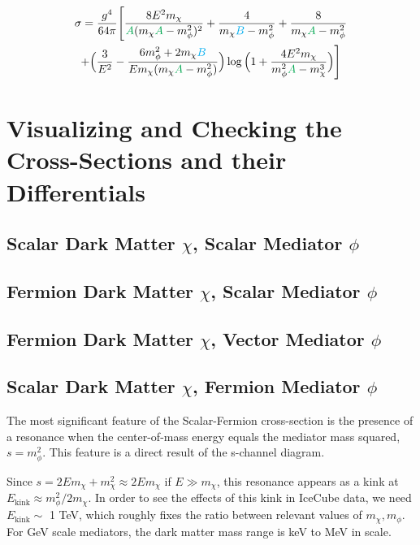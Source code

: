 \documentclass[11pt, oneside]{article}   	%
\begin{document}
\begin{multline*}
    \sigma = \frac{g^4}{64\pi} \Bigg[ \frac{8E^2 m_\chi}{\textcolor{Green}{A}(m_\chi \textcolor{Green}{A} - m_\phi^2)^2} + \frac{4}{m_\chi \textcolor{cyan}{B} - m_\phi^2} + \frac{8}{m_\chi \textcolor{Green}{A} - m_\phi^2} \\
    + \Big( \frac{3}{E^2} - \frac{6m_\phi^2 + 2m_\chi \textcolor{cyan}{B}}{Em_\chi(m_\chi \textcolor{Green}{A} - m_\phi^2)}\Big) \log \Big(1 + \frac{4E^2m_\chi}{m_\phi^2 \textcolor{Green}{A} - m_\chi^3} \Big)  \Bigg]
\end{multline*}

\newpage
\section{\large Visualizing and Checking the Cross-Sections and their Differentials}

\subsection{\normalsize Scalar Dark Matter $\chi$, Scalar Mediator $\phi$ }
\subsection{\normalsize Fermion Dark Matter $\chi$, Scalar Mediator $\phi$ }
\subsection{\normalsize Fermion Dark Matter $\chi$, Vector Mediator $\phi$ }
\subsection{\normalsize Scalar Dark Matter $\chi$, Fermion Mediator $\phi$ }

The most significant feature of the Scalar-Fermion cross-section is the presence of a resonance when the center-of-mass energy equals the mediator mass squared, $s = m_\phi^2$. This feature is a direct result of the s-channel diagram. 

Since $s = 2Em_\chi + m_\chi^2 \approx 2Em_\chi$ if $E \gg m_\chi$, this resonance appears as a kink at $E_\text{kink} \approx m_\phi^2/2m_\chi$. In order to see the effects of this kink in IceCube data, we need $E_\text{kink} \sim$ 1 TeV, which roughly fixes the ratio between relevant values of $m_\chi, m_\phi$. For GeV scale mediators, the dark matter mass range is keV to MeV in scale.
\end{document}
